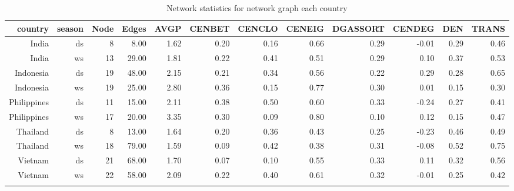 
\begin{table}
\centering
\begin{tabular}{rrrrrrrrrrrr}
  \hline
  country & season & Node & Edges & AVGP & CENBET & CENCLO & CENEIG & DGASSORT & CENDEG & DEN & TRANS \\ 
  \hline
  India & ds &   8 & 8.00 & 1.62 & 0.20 & 0.16 & 0.66 & 0.29 & -0.01 & 0.29 & 0.46 \\ 
  India & ws &  13 & 29.00 & 1.81 & 0.22 & 0.41 & 0.51 & 0.29 & 0.10 & 0.37 & 0.53 \\ 
  Indonesia & ds &  19 & 48.00 & 2.15 & 0.21 & 0.34 & 0.56 & 0.22 & 0.29 & 0.28 & 0.65 \\ 
  Indonesia & ws &  19 & 25.00 & 2.80 & 0.36 & 0.15 & 0.77 & 0.30 & 0.01 & 0.15 & 0.30 \\ 
  Philippines & ds &  11 & 15.00 & 2.11 & 0.38 & 0.50 & 0.60 & 0.33 & -0.24 & 0.27 & 0.41 \\ 
  Philippines & ws &  17 & 20.00 & 3.35 & 0.30 & 0.09 & 0.80 & 0.10 & 0.12 & 0.15 & 0.47 \\ 
  Thailand & ds &   8 & 13.00 & 1.64 & 0.20 & 0.36 & 0.43 & 0.25 & -0.23 & 0.46 & 0.49 \\ 
  Thailand & ws &  18 & 79.00 & 1.59 & 0.09 & 0.42 & 0.38 & 0.31 & -0.08 & 0.52 & 0.75 \\ 
  Vietnam & ds &  21 & 68.00 & 1.70 & 0.07 & 0.10 & 0.55 & 0.33 & 0.11 & 0.32 & 0.56 \\ 
  Vietnam & ws &  22 & 58.00 & 2.09 & 0.22 & 0.40 & 0.61 & 0.32 & -0.01 & 0.25 & 0.42 \\ 
   \hline
     \caption{Network statistics for network graph each country}
\label{table:Network_stat}
\end{tabular}
\end{table}